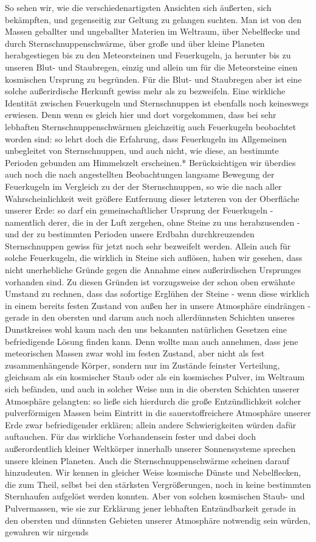\documentclass[a4paper, 8pt, oneside, polutonikogreek, german]{article}
\begin{document}
So sehen wir, wie die verschiedenartigsten Ansichten sich äußerten, sich bekämpften, und gegenseitig zur Geltung zu gelangen suchten. Man ist von den Massen geballter und ungeballter Materien im Weltraum, über Nebelflecke und durch Sternschnuppenschwärme, über große und über kleine Planeten herabgestiegen bis zu den Meteorsteinen und Feuerkugeln, ja herunter bis zu unseren Blut- und Staubregen, einzig und allein um für die Meteorsteine einen kosmischen Ursprung zu begründen. Für die Blut- und Staubregen aber ist eine solche außerirdische Herkunft gewiss mehr als zu bezweifeln. Eine wirkliche Identität zwischen Feuerkugeln und Sternschnuppen ist ebenfalls noch keineswegs erwiesen. Denn wenn es gleich hier und dort vorgekommen, dass bei sehr lebhaften Sternschnuppenschwärmen gleichzeitig auch Feuerkugeln beobachtet worden sind: so lehrt doch die Erfahrung, dass Feuerkugeln im Allgemeinen unbegleitet von Sternschnuppen, und auch nicht, wie diese, an bestimmte Perioden gebunden am Himmelszelt erscheinen.* Berücksichtigen wir überdies auch noch die nach angestellten Beobachtungen langsame Bewegung der Feuerkugeln im Vergleich zu der der Sternschnuppen, so wie die nach aller Wahrscheinlichkeit weit größere Entfernung dieser letzteren von der Oberfläche unserer Erde: so darf ein gemeinschaftlicher Ursprung der Feuerkugeln - namentlich derer, die in der Luft zergehen, ohne Steine zu uns herabzusenden - und der zu bestimmten Perioden unsere Erdbahn durchkreuzenden Sternschnuppen gewiss für jetzt noch sehr bezweifelt werden. Allein auch für solche Feuerkugeln, die wirklich in Steine sich auflösen, haben wir gesehen, dass nicht unerhebliche Gründe gegen die Annahme eines außerirdischen Ursprunges vorhanden sind. Zu diesen Gründen ist vorzugsweise der schon oben erwähnte Umstand zu rechnen, dass das sofortige Erglühen der Steine - wenn diese wirklich in einem bereits festen Zustand von außen her in unsere Atmosphäre eindrängen - gerade in den obersten und darum auch noch allerdünnsten Schichten unseres Dunstkreises wohl kaum nach den uns bekannten natürlichen Gesetzen eine befriedigende Lösung finden kann. Denn wollte man auch annehmen, dass jene meteorischen Massen zwar wohl im festen Zustand, aber nicht als fest zusammenhängende Körper, sondern nur im Zustände feinster Verteilung, gleichsam als ein kosmischer Staub oder als ein kosmisches Pulver, im Weltraum sich befänden, und auch in solcher Weise nun in die obersten Schichten unserer Atmosphäre gelangten: so ließe sich hierdurch die große Entzündlichkeit solcher pulverförmigen Massen beim Eintritt in die sauerstoffreichere Atmosphäre unserer Erde zwar befriedigender erklären; allein andere Schwierigkeiten würden dafür auftauchen. Für das wirkliche Vorhandensein fester und dabei doch außerordentlich kleiner Weltkörper innerhalb unserer Sonnensysteme sprechen unsere kleinen Planeten. Auch die Sternschnuppenschwärme scheinen darauf hinzudeuten. Wir kennen in gleicher Weise kosmische Dünste und Nebelflecken, die zum Theil, selbst bei den stärksten Vergrößerungen, noch in keine bestimmten Sternhaufen aufgelöst werden konnten. Aber von solchen kosmischen Staub- und Pulvermassen, wie sie zur Erklärung jener lebhaften Entzündbarkeit gerade in den obersten und dünnsten Gebieten unserer Atmosphäre notwendig sein würden, gewahren wir nirgends 
\end{document}
